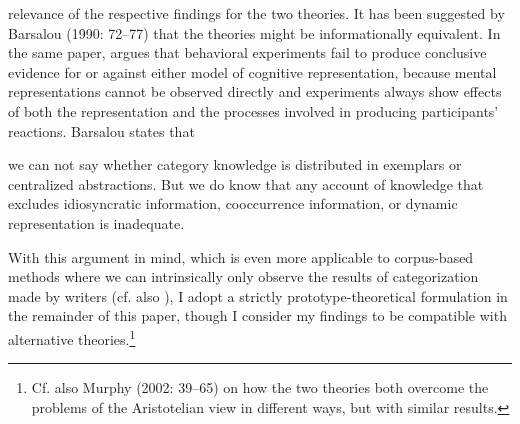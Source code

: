 \begin{styleMoutonText}
relevance of the respective findings for the two theories. It has been suggested by Barsalou (1990: 72–77) that the theories might be informationally equivalent. In the same paper, \citet[63]{Barsalou1990} argues that behavioral experiments fail to produce conclusive evidence for or against either model of cognitive representation, because mental representations cannot be observed directly and experiments always show effects of both the representation and the processes involved in producing participants’ reactions. Barsalou states that
\end{styleMoutonText}

\begin{styleMoutonQuote}
we can not say whether category knowledge is distributed in exemplars or centralized abstractions. But we do know that any account of knowledge that excludes idiosyncratic information, cooccurrence information, or dynamic representation is inadequate. \citep[84]{Barsalou1990}
\end{styleMoutonQuote}

\begin{styleMoutonText}
With this argument in mind, which is even more applicable to corpus-based methods where we can intrinsically only observe the results of categorization made by writers (cf. also ), I adopt a strictly prototype-theoretical formulation in the remainder of this paper, though I consider my findings to be compatible with alternative theories.\footnote{Cf. also Murphy (2002: 39–65) on how the two theories both overcome the problems of the Aristotelian view in different ways, but with similar results.}
\end{styleMoutonText}

